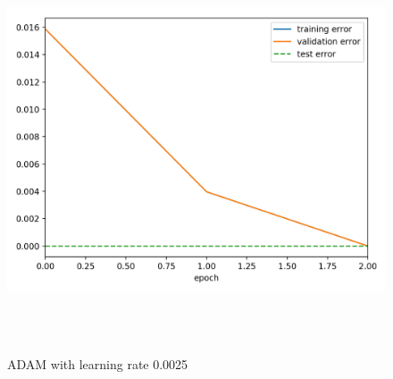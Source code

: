 \documentclass[a4paper]{article}
\begin{document}
\begin{figure}[h]
\caption{ADAM with learning rate 0.0025}
\centering
\includegraphics[width=15cm, height=12cm]{AD_LR0025}
\end{figure}
\end{document}
